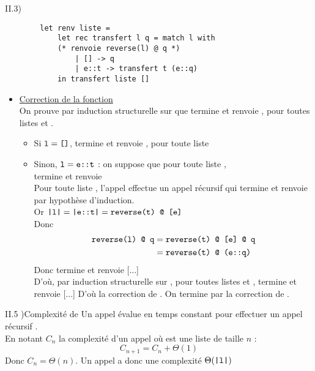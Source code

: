 \begin{question}{II.3) }{}
    \begin{verbatim}
        let renv liste = 
            let rec transfert l q = match l with 
            (* renvoie reverse(l) @ q *)
                | [] -> q
                | e::t -> transfert t (e::q)
            in transfert liste []
    \end{verbatim}
    \begin{itemize}
        \item \underline{Correction de la fonction } \\ On prouve par induction structurelle sur  que  termine et renvoie , pour toutes listes  et . \begin{itemize}
            \item Si $\texttt{l} = \texttt{[]}$,  termine et renvoie , pour toute liste 
            \item Sinon, $\texttt{l} = \texttt{e::t}$ : on suppose que pour toute liste , \\  termine et renvoie  \\ Pour toute liste , l'appel  effectue un appel récursif  qui termine et renvoie  par hypothèse d'induction.\\
            Or $\texttt{|l|} = \texttt{|e::t|} = \texttt{\texttt{reverse(t)} @ [e]}$ \\
            Donc \begin{align*}
                \texttt{\texttt{reverse(l)} @ q} &= \texttt{\texttt{reverse(t)} @ [e] @ q} \\
                &= \texttt{\texttt{reverse(t)} @ (e::q)}
            \end{align*}
            Donc  termine et renvoie [...] \\
            D'où, par induction structurelle sur , pour toutes listes  et ,  termine et renvoie [...]
            D'où la correction de . On termine par la correction de .
        \end{itemize}
    \end{itemize}
\end{question}

\begin{question}{II.5 )}{Complexité de }
    Un appel  évalue  en temps constant pour effectuer un appel récursif . \\
    En notant $C_n$ la complexité d'un appel  où  est une liste de taille $n$ : $$C_{n+1} = C_n + \Theta(1)$$
    Donc $C_n = \Theta(n)$. Un appel  a donc une complexité $\Theta(\texttt{|l|})$
\end{question}


